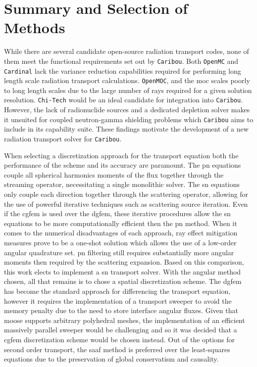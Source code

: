 \section{Summary and Selection of Methods}
\label{lit_review:summary}

While there are several candidate open-source radiation transport codes, none of them meet the functional requirements set out by \texttt{Caribou}. Both \texttt{OpenMC} and \texttt{Cardinal} lack the variance reduction capabilities required for performing long length scale radiation transport calculations. \texttt{OpenMOC}, and the \acrshort{moc} scales poorly to long length scales due to the large number of rays required for a given solution resolution. \texttt{Chi-Tech} would be an ideal candidate for integration into \texttt{Caribou}. However, the lack of radionuclide sources and a dedicated depletion solver makes it unsuited for coupled neutron-gamma shielding problems which \texttt{Caribou} aims to include in its capability suite. These findings motivate the development of a new radiation transport solver for \texttt{Caribou}.

When selecting a discretization approach for the transport equation both the performance of the scheme and its accuracy are paramount. The \acrshort{pn} equations couple all spherical harmonics moments of the flux together through the streaming operator, necessitating a single monolithic solver. The \acrshort{sn} equations only couple each direction together through the scattering operator, allowing for the use of powerful iterative techniques such as scattering source iteration. Even if the \acrshort{cgfem} is used over the \acrshort{dgfem}, these iterative procedures allow the \acrshort{sn} equations to be more computationally efficient then the \acrshort{pn} method. When it comes to the numerical disadvantages of each approach, ray effect mitigation measures prove to be a one-shot solution which allows the use of a low-order angular quadrature set. \acrshort{pn} filtering still requires substantially more angular moments then required by the scattering expansion. Based on this comparison, this work elects to implement a \acrshort{sn} transport solver. With the angular method chosen, all that remains is to chose a spatial discretization scheme. The \acrshort{dgfem} has become the standard approach for differencing the transport equation, however it requires the implementation of a transport sweeper to avoid the memory penalty due to the need to store interface angular fluxes. Given that \acrshort{moose} supports arbitrary polyhedral meshes, the implementation of an efficient massively parallel sweeper \cite{massively_parallel_sweeps} would be challenging and so it was decided that a \acrshort{cgfem} discretization scheme would be chosen instead. Out of the options for second order transport, the \acrshort{saaf} method is preferred over the least-squares equations due to the preservation of global conservatism and causality. 

